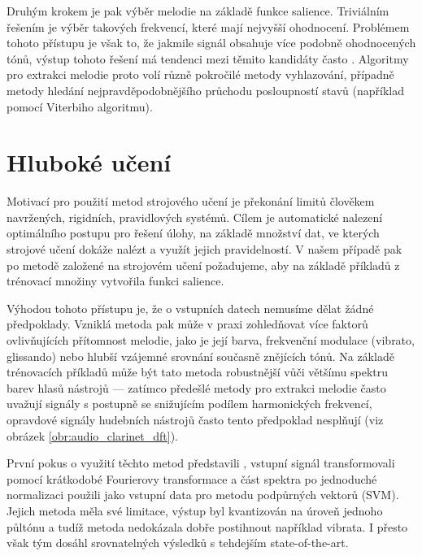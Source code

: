 Druhým krokem je pak výběr melodie na základě funkce salience. Triviálním řešením je výběr takových frekvencí, které mají nejvyšší ohodnocení. Problémem tohoto přístupu je však to, že jakmile signál obsahuje více podobně ohodnocených tónů, výstup tohoto řešení má tendenci mezi těmito kandidáty často . Algoritmy pro extrakci melodie proto volí různě pokročilé metody vyhlazování, případně metody hledání nejpravděpodobnějšího průchodu posloupností stavů (například pomocí Viterbiho algoritmu).

\section{Hluboké učení}

Motivací pro použití metod strojového učení je překonání limitů člověkem navržených, rigidních, pravidlových systémů. Cílem je automatické nalezení optimálního postupu pro řešení úlohy, na základě množství dat, ve kterých strojové učení dokáže nalézt a využít jejich pravidelností. V našem případě pak po metodě založené na strojovém učení požadujeme, aby na základě příkladů z trénovací množiny vytvořila funkci salience.

Výhodou tohoto přístupu je, že o vstupních datech nemusíme dělat žádné předpoklady. Vzniklá metoda pak může v praxi zohledňovat více faktorů ovlivňujících přítomnost melodie, jako je její barva, frekvenční modulace (vibrato, glissando) nebo hlubší vzájemné srovnání současně znějících tónů. Na základě trénovacích příkladů může být tato metoda robustnější vůči většímu spektru barev hlasů nástrojů --- zatímco předešlé metody pro extrakci melodie často uvažují signály s postupně se snižujícím podílem harmonických frekvencí, opravdové signály hudebních nástrojů často tento předpoklad nesplňují (viz obrázek \ref{obr:audio_clarinet_dft}).

První pokus o využití těchto metod představili \cite{Poliner}, vstupní signál transformovali pomocí krátkodobé Fourierovy transformace a část spektra po jednoduché normalizaci použili jako vstupní data pro metodu podpůrných vektorů (SVM). Jejich metoda měla své limitace, výstup byl kvantizován na úroveň jednoho půltónu a tudíž metoda nedokázala dobře postihnout například vibrata. I přesto však tým dosáhl srovnatelných výsledků s tehdejším state-of-the-art. 


